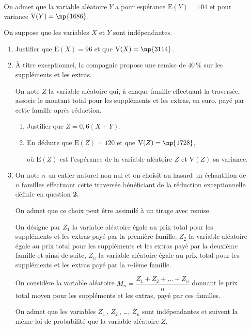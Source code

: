	On admet que la variable aléatoire $Y$ a pour espérance $\mathrm{E}(Y)=104$ et pour variance $\mathrm{V}(Y)=\np{1686}$.

	\medskip

	On suppose que les variables $X$ et $Y$ sont indépendantes.

	\begin{enumerate}
		\item Justifier que \quad $\mathrm{E}(X)=96$ \quad et que \quad $\mathrm{V}(X)=\np{3114}$.

		\item À titre exceptionnel, la compagnie propose une remise de $40\,\%$ sur les suppléments et les extras.

		On note $Z$ la variable aléatoire qui, à chaque famille effectuant la traversée, associe le montant total pour les suppléments et les extras, en euro, payé par cette famille après réduction.

		\begin{enumerate}
			\item Justifier que \quad $Z = 0,6(X + Y)$.
			\item En déduire que \quad $\mathrm{E}(Z)=120$ \quad et que \quad $\mathrm{V}(Z)=\np{1728}$,

			où $\mathrm{E}(Z)$ est l'espérance de la variable aléatoire $Z$ et $\mathrm{V}(Z)$ sa variance.
		\end{enumerate}

		\item On note $n$ un entier naturel non nul et on choisit au hasard un échantillon de $n$ familles effectuant cette traversée bénéficiant de la réduction exceptionnelle définie en question \textbf{2.}

		On admet que ce choix peut être assimilé à un tirage avec remise.

		On désigne par $Z_{1}$ la variable aléatoire égale au prix total pour les suppléments et les extras payé par la première famille, $Z_{2}$ la variable aléatoire égale au prix total pour les suppléments et les extras payé par la deuxième famille et ainsi de suite, $Z_{n}$ la variable aléatoire égale au prix total pour les suppléments et les extras payé par la $n$-ième famille.

		On considère la variable aléatoire \quad $M_{n}=\dfrac{Z_{1}+Z_{2}+\ldots+Z_{n}}{n}$ \quad donnant le prix total moyen pour les suppléments et les extras, payé par ces familles.

		On admet que les variables $Z_{1}$\,, $Z_{2}$\,, \ldots, $Z_{n}$ sont indépendantes et suivent la même loi de probabilité que la variable aléatoire $Z$.


\end{enumerate}
